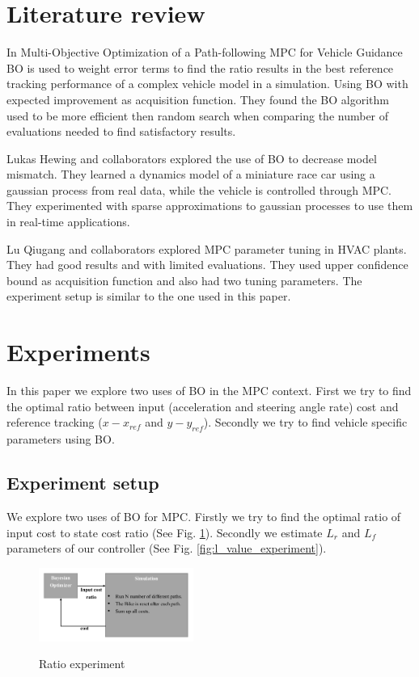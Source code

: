 \documentclass[twoside,twocolumn]{article}
\begin{document}
\section{Literature review}
In Multi-Objective Optimization of a Path-following MPC for Vehicle Guidance \cite{gharib2021multi} BO is used to weight error terms to find the ratio results in the best reference tracking performance of a complex vehicle model in a simulation. Using BO with expected improvement as acquisition function. They found the BO algorithm used to be more efficient then random search when comparing the number of evaluations needed to find satisfactory results.

Lukas Hewing and collaborators \cite{hewing2018cautious} explored the use of BO to decrease model mismatch. They learned a dynamics model of a miniature race car using a gaussian process from real data, while the vehicle is controlled through MPC. They experimented with sparse approximations to gaussian processes to use them in real-time applications.

Lu Qiugang and collaborators \cite{lu2020mpc} explored MPC parameter tuning in HVAC plants. They had good results and with limited evaluations. They used upper confidence bound as acquisition function and also had two tuning parameters. The experiment setup is similar to the one used in this paper.


\section{Experiments}

In this paper we explore two uses of BO in the MPC context. First we try to find the optimal ratio between input (acceleration and steering angle rate) cost and reference tracking ($x - x_{ref}$ and $y - y_{ref}$). Secondly we try to find vehicle specific parameters using BO.

\subsection{Experiment setup}

We explore two uses of BO for MPC. Firstly we try to find the optimal ratio of input cost to state cost ratio (See Fig. \ref{fig:ratio_experiment}). Secondly we estimate $L_r$ and $L_f$ parameters of our controller (See Fig. \ref{fig:l_value_experiment}).

\begin{figure}[h]
    \caption{Ratio experiment}
    \centering
    \includegraphics[width=0.45\textwidth]{fig_ratio_experiment.pdf}
    \label{fig:ratio_experiment}
\end{figure}
\end{document}
